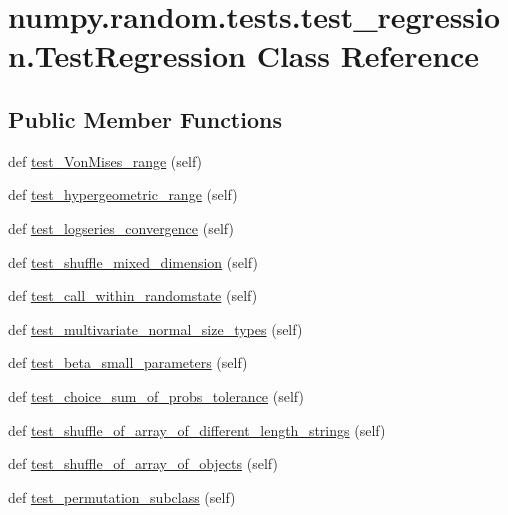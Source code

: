 \hypertarget{classnumpy_1_1random_1_1tests_1_1test__regression_1_1TestRegression}{}\section{numpy.\+random.\+tests.\+test\+\_\+regression.\+Test\+Regression Class Reference}
\label{classnumpy_1_1random_1_1tests_1_1test__regression_1_1TestRegression}
\subsection*{Public Member Functions}
\begin{DoxyCompactItemize}
\item 
def \hyperlink{classnumpy_1_1random_1_1tests_1_1test__regression_1_1TestRegression_a866b470dfc1dcb4fbe14f8875c4d4af9}{test\+\_\+\+Von\+Mises\+\_\+range} (self)
\item 
def \hyperlink{classnumpy_1_1random_1_1tests_1_1test__regression_1_1TestRegression_aeec39bad62f4d7b9b444a1bea752b56b}{test\+\_\+hypergeometric\+\_\+range} (self)
\item 
def \hyperlink{classnumpy_1_1random_1_1tests_1_1test__regression_1_1TestRegression_a263eb9042c7964a3fb501d441f96ebd2}{test\+\_\+logseries\+\_\+convergence} (self)
\item 
def \hyperlink{classnumpy_1_1random_1_1tests_1_1test__regression_1_1TestRegression_a846b799f7f705c3cc684decf84716344}{test\+\_\+shuffle\+\_\+mixed\+\_\+dimension} (self)
\item 
def \hyperlink{classnumpy_1_1random_1_1tests_1_1test__regression_1_1TestRegression_a2799af808db433017f869f741f1bac33}{test\+\_\+call\+\_\+within\+\_\+randomstate} (self)
\item 
def \hyperlink{classnumpy_1_1random_1_1tests_1_1test__regression_1_1TestRegression_a46d8567de27102919d0626a28d01f250}{test\+\_\+multivariate\+\_\+normal\+\_\+size\+\_\+types} (self)
\item 
def \hyperlink{classnumpy_1_1random_1_1tests_1_1test__regression_1_1TestRegression_a0c96386b25e1777f060920ce4428a107}{test\+\_\+beta\+\_\+small\+\_\+parameters} (self)
\item 
def \hyperlink{classnumpy_1_1random_1_1tests_1_1test__regression_1_1TestRegression_a0954ffabb9bd01a4944a12be1e02cde1}{test\+\_\+choice\+\_\+sum\+\_\+of\+\_\+probs\+\_\+tolerance} (self)
\item 
def \hyperlink{classnumpy_1_1random_1_1tests_1_1test__regression_1_1TestRegression_a6a0e5eb1ce90cabba40df0dd2e8779cc}{test\+\_\+shuffle\+\_\+of\+\_\+array\+\_\+of\+\_\+different\+\_\+length\+\_\+strings} (self)
\item 
def \hyperlink{classnumpy_1_1random_1_1tests_1_1test__regression_1_1TestRegression_a6937516ee654372b3a5b4540946b8acb}{test\+\_\+shuffle\+\_\+of\+\_\+array\+\_\+of\+\_\+objects} (self)
\item 
def \hyperlink{classnumpy_1_1random_1_1tests_1_1test__regression_1_1TestRegression_a6cba40bee980990d51aa2c0716f11a84}{test\+\_\+permutation\+\_\+subclass} (self)
\end{DoxyCompactItemize}


